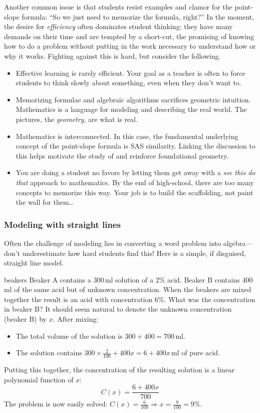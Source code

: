 Another common issue is that students resist examples and clamor for the point-slope formula: ``So we just need to memorize the formula, right?'' In the moment, the desire for \emph{efficiency} often dominates student thinking: they have many demands on their time and are tempted by a short-cut, the promising of knowing how to do a problem without putting in the work necessary to understand how or why it works. Fighting against this is hard, but consider the following.
\begin{itemize}
  \item Effective learning is rarely efficient. Your goal as a teacher is often to force students to think slowly about something, even when they don't want to. 
  \item Memorizing formulae and algebraic algorithms sacrifices geometric intuition. Mathematics is a language for modeling and describing the real world. The pictures, the \emph{geometry}, are what is real.
  \item Mathematics is interconnected. In this case, the fundamental underlying concept of the point-slope formula is SAS similarity. Linking the discussion to this helps motivate the study of and reinforce foundational geometry. 
  \item You are doing a student no favors by letting them get away with a \emph{see this do that} approach to mathematics. By the end of high-school, there are too many concepts to memorize this way. Your job is to build the scaffolding, not paint the wall for them\ldots
\end{itemize}



\subsubsection*{Modeling with straight lines}

Often the challenge of modeling lies in converting a word problem into algebra---don't underestimate how hard students find this! Here is a simple, if disguised, straight line model.
	
\begin{example}{}{beakers}
	Beaker A contains a 300\,ml solution of a 2\% acid. Beaker B contains 400\,ml of the same acid but of unknown concentration. When the beakers are mixed together the result is an acid with concentration 6\%. What was the concentration in beaker B?\smallbreak
	It should seem natural to denote the unknown concentration (beaker B) by $x$. After mixing:
	\begin{itemize}
	  \item The total volume of the solution is $300+400=700$\,ml.
	  \item The solution contains $300\times\frac 2{100}+400x =6+400x$\,ml of pure acid.
	\end{itemize}
	Putting this together, the concentration of the resulting solution is a linear polynomial function of $x$:
	\[
	 C(x)=\frac{6+400x}{700}
	\]
	The problem is now easily solved: $C(x)=\frac 6{100}\Longrightarrow x=\frac 9{100}=9\%$.
\end{example}

